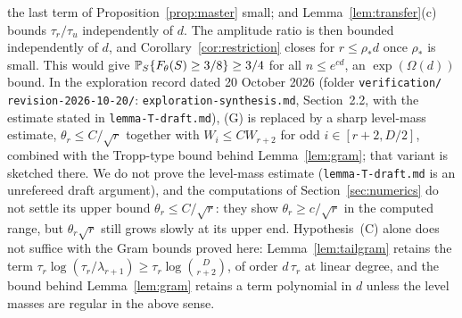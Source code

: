 \begin{remark}
the last term of Proposition~\ref{prop:master} small; and
Lemma~\ref{lem:transfer}(c) bounds $\tau_r/\tau_u$ independently of $d$.
The amplitude ratio is then bounded independently of $d$, and
Corollary~\ref{cor:restriction} closes for $r\le\rho_*d$ once $\rho_*$ is
small. This would give $\mathbb P_S\{F_\theta(S)\ge3/8\}\ge3/4$ for all
$n\le e^{cd}$, an $\exp(\Omega(d))$ bound. In the exploration record
dated 20 October 2026 (folder \texttt{verification/\allowbreak
revision-2026-10-20/}: \texttt{exploration-synthesis.md}, Section~2.2, with
the estimate stated in \texttt{lemma-T-draft.md}), (G) is replaced by a
sharp level-mass estimate, $\theta_r\le C/\sqrt r$ together with
$W_i\le CW_{r+2}$ for odd $i\in[r+2,D/2]$, combined with the Tropp-type
bound behind Lemma~\ref{lem:gram}; that variant is sketched there. We do
not prove the level-mass estimate (\texttt{lemma-T-draft.md} is an
unrefereed draft argument), and the computations of
Section~\ref{sec:numerics} do not settle its upper bound
$\theta_r\le C/\sqrt r$: they show $\theta_r\ge c/\sqrt r$ in the computed
range, but $\theta_r\sqrt r$ still grows slowly at its upper end.
Hypothesis~(C) alone does not suffice with the
Gram bounds proved here: Lemma~\ref{lem:tailgram} retains the term
$\tau_r\log(\tau_r/\lambda_{r+1})\ge\tau_r\log\binom D{r+2}$, of order
$d\,\tau_r$ at linear degree, and the bound behind Lemma~\ref{lem:gram}
retains a term polynomial in $d$ unless the level masses are regular in the
above sense.
\end{remark}
